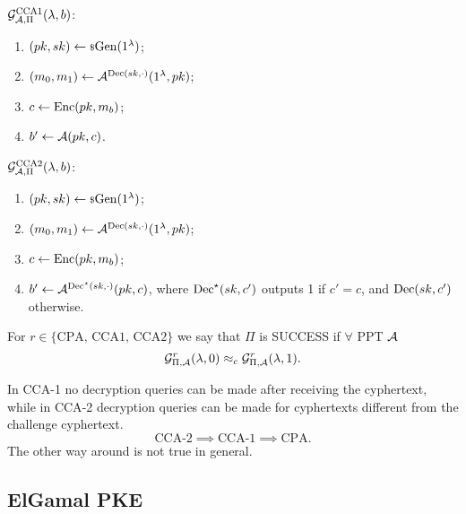 \begin{definition}
	$\mathcal{G}_{\mathcal{A}, \Pi}^{\text{CCA{1}}}(\lambda, b)$:
	\begin{enumerate}
		\item $(pk, sk) \leftarrow {\scriptstyle \$} {\mathrm{Gen}(1^{\lambda})}$;
		\item $(m_0, m_1) \leftarrow \mathcal{A}^{\mathrm{Dec}(sk, \cdot)}(1^{\lambda}, pk)$;
		\item $c \leftarrow \mathrm{Enc}(pk, m_b)$;
		\item $b' \leftarrow \mathcal{A}(pk, c)$. \qedhere
	\end{enumerate}
\end{definition}

\begin{definition}
	$\mathcal{G}_{\mathcal{A}, \Pi}^{\text{CCA{2}}}(\lambda, b)$:
	\begin{enumerate}
		\item $(pk, sk) \leftarrow {\scriptstyle \$} {\mathrm{Gen}(1^{\lambda})}$;
		\item $(m_0, m_1) \leftarrow \mathcal{A}^{\mathrm{Dec}(sk, \cdot)}(1^{\lambda}, pk)$;
		\item $c \leftarrow \mathrm{Enc}(pk, m_b)$;
		\item $b' \leftarrow \mathcal{A}^{\mathrm{Dec}^{\star}(sk, \cdot)}(pk, c)$, where $\mathrm{Dec}^{\star}(sk, c')$ outputs 1 if $c' = c$, and $\mathrm{Dec}(sk, c')$ otherwise. \qedhere
	\end{enumerate}
\end{definition}

For $r \in \{ \text{CPA, CCA1, CCA2} \}$ we say that $\Pi$ is SUCCESS if $\forall$ \ac{PPT} $\mathcal{A}$
\begin{equation*}
	\mathcal{G}^{r}_{\Pi, \mathcal{A}} (\lambda, 0) \approx_c \mathcal{G}^{r}_{\Pi, \mathcal{A}} (\lambda, 1).
\end{equation*}

In \ac{CCA}-1 no decryption queries can be made after receiving the cyphertext, while in \ac{CCA}-2 decryption queries can be made for cyphertexts different from the challenge cyphertext.
\begin{equation*}
	\text{CCA-2} \implies \text{CCA-1} \implies \text{CPA}.
\end{equation*}
The other way around is not true in general.

\subsection{ElGamal \acs{PKE}}

